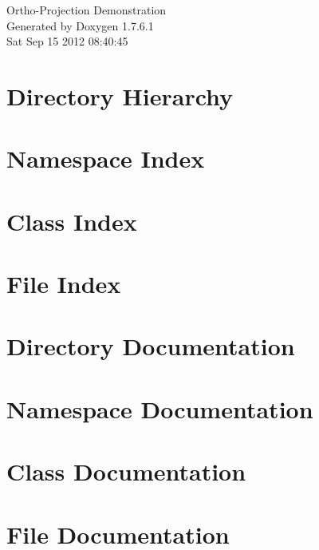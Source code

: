 \documentclass[a4paper]{book}
\begin{document}
\hypersetup{pageanchor=false,citecolor=blue}
\begin{titlepage}
\vspace*{7cm}
\begin{center}
{\Large \-Ortho-\/\-Projection \-Demonstration }\\
\vspace*{1cm}
{\large \-Generated by Doxygen 1.7.6.1}\\
\vspace*{0.5cm}
{\small Sat Sep 15 2012 08:40:45}\\
\end{center}
\end{titlepage}
\clearemptydoublepage
{}
\tableofcontents
\clearemptydoublepage
{}
\hypersetup{pageanchor=true,citecolor=blue}
\chapter{\-Directory \-Hierarchy}

\chapter{\-Namespace \-Index}

\chapter{\-Class \-Index}

\chapter{\-File \-Index}

\chapter{\-Directory \-Documentation}




\chapter{\-Namespace \-Documentation}

\chapter{\-Class \-Documentation}




\chapter{\-File \-Documentation}



















\printindex
\end{document}
